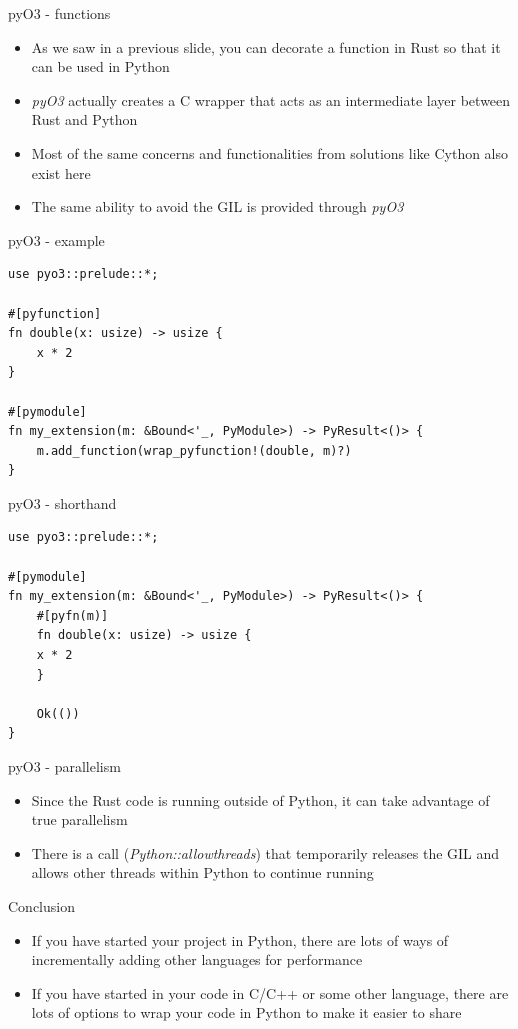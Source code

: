 \documentclass[presentation]{beamer}
\begin{document}
\begin{frame}[label=pyo3---functions]{pyO3 - functions}
\begin{itemize}
\item As we saw in a previous slide, you can decorate a function in Rust so
that it can be used in Python
\item \alert{\emph{pyO3}} actually creates a C wrapper that acts as an intermediate
layer between Rust and Python
\item Most of the same concerns and functionalities from solutions like
Cython also exist here
\item The same ability to avoid the GIL is provided through \alert{\emph{pyO3}}
\end{itemize}
\end{frame}
\begin{frame}[label=pyo3---example,fragile]{pyO3 - example}
 \begin{verbatim}
use pyo3::prelude::*;

#[pyfunction]
fn double(x: usize) -> usize {
    x * 2
}

#[pymodule]
fn my_extension(m: &Bound<'_, PyModule>) -> PyResult<()> {
    m.add_function(wrap_pyfunction!(double, m)?)
}
\end{verbatim}
\end{frame}
\begin{frame}[label=pyo3---shorthand,fragile]{pyO3 - shorthand}
 \begin{verbatim}
use pyo3::prelude::*;

#[pymodule]
fn my_extension(m: &Bound<'_, PyModule>) -> PyResult<()> {
    #[pyfn(m)]
    fn double(x: usize) -> usize {
    x * 2
    }

    Ok(())
}
\end{verbatim}
\end{frame}
\begin{frame}[label=pyo3---parallelism]{pyO3 - parallelism}
\begin{itemize}
\item Since the Rust code is running outside of Python, it can take
advantage of true parallelism
\item There is a call (\alert{\emph{Python::allow\textunderscore threads}}) that temporarily releases
the GIL and allows other threads within Python to continue running
\end{itemize}
\end{frame}
\begin{frame}[label=conclusion]{Conclusion}
\begin{itemize}
\item If you have started your project in Python, there are lots of ways of
incrementally adding other languages for performance
\item If you have started in your code in C/C++ or some other language,
there are lots of options to wrap your code in Python to make it
easier to share
\end{itemize}
\end{frame}
\end{document}
